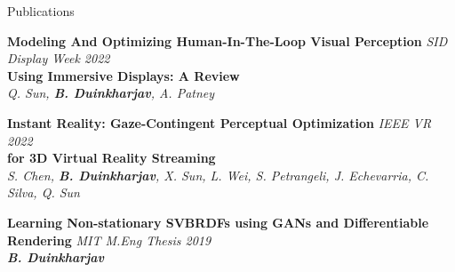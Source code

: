 \documentclass{resume}
\begin{document}
\begin{area}{Publications}
    \item
        \textbf{Modeling And Optimizing Human-In-The-Loop Visual
        Perception}
        \hfill
        \emph{SID Display Week 2022}\\
        \textbf{Using Immersive Displays: A Review}
        \\%
        \hspace*{2mm}
        \emph{Q. Sun, \textbf{B. Duinkharjav}, A. Patney}
    \newpage
    \item
        \textbf{Instant Reality: Gaze-Contingent Perceptual Optimization}
        \hfill
        \emph{IEEE VR 2022}\\
        \textbf{for 3D Virtual Reality Streaming}
        \\%
        \hspace*{2mm}
        \emph{S. Chen, \textbf{B. Duinkharjav}, X. Sun, L. Wei, S. Petrangeli, J. Echevarria, C. Silva, Q. Sun}
    \item
        \textbf{Learning Non-stationary SVBRDFs using GANs and Differentiable Rendering}
        \hfill
        \emph{MIT M.Eng Thesis 2019}
        \\%
        \hspace*{2mm}
        \emph{\textbf{B. Duinkharjav}}
\end{area}
\end{document}

